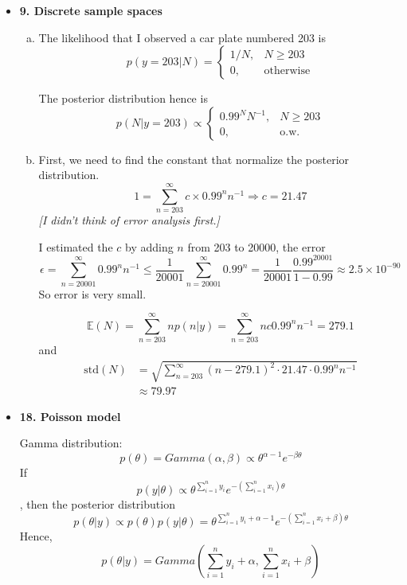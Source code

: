 \documentclass{article}
\newcommand{\E}{\mathbb{E}}
\begin{document}
\begin{itemize}
\begin{enumerate}[(a)]
\end{enumerate}

\item \textbf{9. Discrete sample spaces}
\begin{enumerate}[(a)]

\item The likelihood that I observed a car plate numbered 203 is 
$$p(y=203|N) = \begin{cases} 1/N, &N\geq 203 \\ 0, &\text{otherwise}\end{cases}$$

The posterior distribution hence is
$$
p(N|y=203) \propto \begin{cases}
0.99^{N} N^{-1}, &N\geq 203 \\
0, &\text{o.w.}
\end{cases}
$$

\item First, we need to find the constant that normalize the posterior distribution. 
$$
1 = \sum_{n=203}^{\infty} c \times 0.99^{n} n^{-1} \Rightarrow c = 21.47
$$
\textit{[I didn't think of error analysis first.]}

I estimated the $c$ by adding $n$ from 203 to 20000, the error
$$
\epsilon = \sum_{n=20001}^{\infty} 0.99^{n} n^{-1} \leq \frac{1}{20001} \sum_{n=20001}^{\infty} 0.99^{n} = \frac{1}{20001} \frac{0.99^{20001}}{1-0.99} \approx 2.5\times10^{-90}
$$
So error is very small. 

$$
\E{(N)} = \sum_{n=203}^{\infty} np(n|y) = \sum_{n=203}^{\infty} nc0.99^nn^{-1} = 279.1
$$
and
\begin{align*}
\text{std}(N) &= \sqrt{\sum_{n=203}^{\infty}(n-279.1)^2 \cdot 21.47 \cdot 0.99^n n^{-1}} \\
&\approx 79.97
\end{align*}

\end{enumerate}


\item \textbf{18. Poisson model}

Gamma distribution:
$$
p(\theta) = Gamma (\alpha, \beta) \propto \theta^{\alpha - 1} e^{-\beta \theta}
$$
If 
$$
p(y|\theta) \propto \theta^{\sum_{i=1}^n y_i} e^{-(\sum_{i=1}^nx_i)\theta}
$$,
then the posterior distribution
$$
p(\theta|y) \propto p(\theta)p(y|\theta) = \theta^{\sum_{i=1}^n y_i + \alpha - 1} e^{-(\sum_{i=1}^n x_i+\beta)\theta}
$$
Hence, $$p(\theta|y) = Gamma(\sum_{i=1}^n y_i + \alpha, \sum_{i=1}^n x_i+\beta)$$


\end{itemize}
\end{document}

